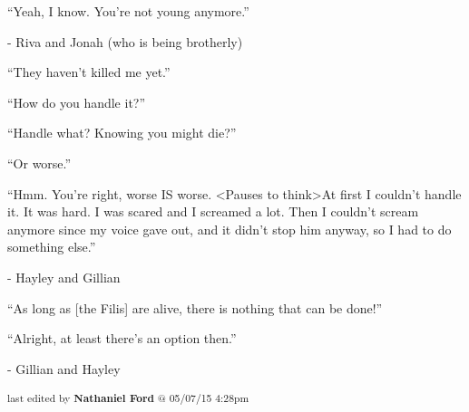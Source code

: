 ``Yeah, I know.  You're not young anymore.''

- Riva and Jonah (who is being brotherly)



``They haven't killed me yet.''

``How do you handle it?''

``Handle what?  Knowing you might die?''

``Or worse.''

``Hmm.  You're right, worse IS worse. \textless Pauses to think\textgreater  At first I couldn't handle it.  It was hard.  I was scared and I screamed a lot.  Then I couldn't scream anymore since my voice gave out, and it didn't stop him anyway, so I had to do something else.''

                - Hayley and Gillian



``As long as {[}the Filis{]} are alive, there is nothing that can be done!''

``Alright, at least there's an option then.''

                - Gillian and Hayley




\vspace{\fill}

\begin{flushright}
\textsubscript{last edited by \textbf{Nathaniel Ford} @ 05/07/15 4:28pm}
\end{flushright}

